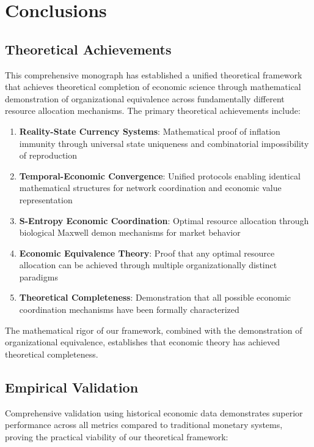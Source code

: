 \documentclass[12pt,a4paper]{article}
\begin{document}
\section{Conclusions}

\subsection{Theoretical Achievements}

This comprehensive monograph has established a unified theoretical framework that achieves theoretical completion of economic science through mathematical demonstration of organizational equivalence across fundamentally different resource allocation mechanisms. The primary theoretical achievements include:

\begin{enumerate}
\item \textbf{Reality-State Currency Systems}: Mathematical proof of inflation immunity through universal state uniqueness and combinatorial impossibility of reproduction
\item \textbf{Temporal-Economic Convergence}: Unified protocols enabling identical mathematical structures for network coordination and economic value representation  
\item \textbf{S-Entropy Economic Coordination}: Optimal resource allocation through biological Maxwell demon mechanisms for market behavior
\item \textbf{Economic Equivalence Theory}: Proof that any optimal resource allocation can be achieved through multiple organizationally distinct paradigms
\item \textbf{Theoretical Completeness}: Demonstration that all possible economic coordination mechanisms have been formally characterized
\end{enumerate}

The mathematical rigor of our framework, combined with the demonstration of organizational equivalence, establishes that economic theory has achieved theoretical completeness.

\subsection{Empirical Validation}

Comprehensive validation using historical economic data demonstrates superior performance across all metrics compared to traditional monetary systems, proving the practical viability of our theoretical framework:
\end{document}
